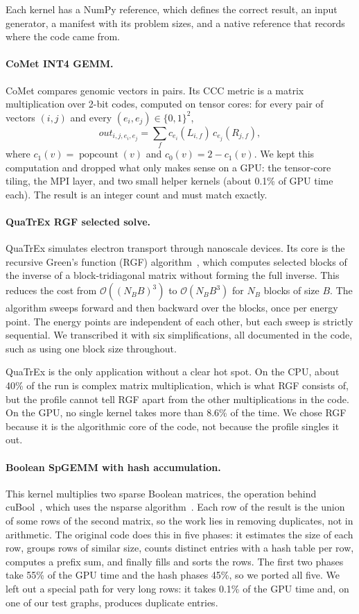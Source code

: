 Each kernel has a NumPy reference, which defines the correct result, an input generator, a
manifest with its problem sizes, and a native reference that records where the code came from.

\paragraph{CoMet INT4 GEMM.}
CoMet compares genomic vectors in pairs. Its CCC metric is a matrix multiplication over 2-bit
codes, computed on tensor cores: for every pair of vectors $(i, j)$ and every
$(e_i, e_j) \in \{0,1\}^2$,
\[
  \mathit{out}_{i,j,e_i,e_j} = \sum_{f} c_{e_i}(L_{i,f})\, c_{e_j}(R_{j,f}),
\]
where $c_1(v) = \operatorname{popcount}(v)$ and $c_0(v) = 2 - c_1(v)$. We kept this computation
and dropped what only makes sense on a GPU: the tensor-core tiling, the MPI layer, and two small
helper kernels (about 0.1\% of GPU time each). The result is an integer count and must match
exactly.

\paragraph{QuaTrEx RGF selected solve.}
QuaTrEx simulates electron transport through nanoscale devices. Its core is the recursive
Green's function (RGF) algorithm~\cite{svizhenko2002rgf}, which computes selected blocks of the
inverse of a block-tridiagonal matrix without forming the full inverse. This reduces the cost
from $\mathcal{O}((N_B B)^3)$ to $\mathcal{O}(N_B B^3)$ for $N_B$ blocks of size $B$. The
algorithm sweeps forward and then backward over the blocks, once per energy point. The energy
points are independent of each other, but each sweep is strictly sequential. We transcribed it
with six simplifications, all documented in the code, such as using one block size throughout.

QuaTrEx is the only application without a clear hot spot. On the CPU, about 40\% of the run is
complex matrix multiplication, which is what RGF consists of, but the profile cannot tell RGF
apart from the other multiplications in the code. On the GPU, no single kernel takes more than
8.6\% of the time. We chose RGF because it is the algorithmic core of the code, not because the
profile singles it out.

\paragraph{Boolean SpGEMM with hash accumulation.}
This kernel multiplies two sparse Boolean matrices, the operation behind
cuBool~\cite{cubool}, which uses the nsparse algorithm~\cite{nagasaka2017nsparse}. Each row
of the result is the union of some rows of the second matrix, so the work lies in removing
duplicates, not in arithmetic. The original code does this in five phases: it estimates the
size of each row, groups rows of similar size, counts distinct entries with a hash table per
row, computes a prefix sum, and finally fills and sorts the rows. The first two phases take
55\% of the GPU time and the hash phases 45\%, so we ported all five. We left out a special
path for very long rows: it takes 0.1\% of the GPU time and, on one of our test graphs,
produces duplicate entries.

